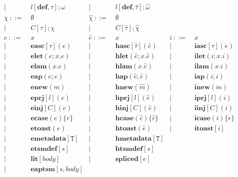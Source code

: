 \documentclass{sig-alternate}[10pt]
\newcommand{\T}{\mathtt{T}}
\begin{document}
\[\begin{array}{rlrlrl}
   |~&  ~l[\mathbf{def}, \tau];\omega       &|~ & ~l[\mathbf{def}, \hat\tau];\hat\omega\\
   \chi       ~::=&~  \emptyset         &\hat\chi ~::=&~  \emptyset\\
   |~&  ~C[\tau];\chi               &|~&  ~C[\hat\tau];\hat{\chi}\\
  e       ~::=&~ x                &\hat{e}  ~::=&~  x                     & i     ~::=&~  x\\
        | ~ &~ \mathbf{easc}[\tau](e)     &       | ~ &~  \mathbf{hasc}[\hat\tau](\hat{e})    &       | ~ &~  \mathbf{iasc}[\tau](\dot{e})\\
        | ~ &~ \mathbf{elet}(e; x.e)        &       | ~ &~  \mathbf{hlet}(\hat{e}; x.\hat{e})   &       | ~ &~  \mathbf{ilet}(i;x.i)\\
        | ~ &~ \mathbf{elam}(x.e)           &       | ~ &~  \mathbf{hlam}(x.\hat{e})        &       | ~ &~  \mathbf{ilam}(x.i)\\
        | ~ &~ \mathbf{eap}(e;e)          &       | ~ &~  \mathbf{hap}(\hat{e};\hat{e})     &       | ~ &~  \mathbf{iap}(i;i)\\
        | ~ &~ \mathbf{enew}(m)           &       | ~ &~  \mathbf{hnew}(\hat{m})          &       | ~ &~  \mathbf{inew}(\dot{m})\\
        | ~ &~ \mathbf{eprj}[l](e)          &       | ~ &~  \mathbf{hprj}[l](\hat{e})       &       | ~ &~  \mathbf{iprj}[l](i)\\
        | ~ &~ \mathbf{einj}[C](e)          &       | ~ &~  \mathbf{hinj}[C](\hat{e})       &       | ~ &~  \mathbf{iinj}[C](i)\\
        | ~ &~ \mathbf{ecase}(e)\{r\}         &       | ~ &~  \mathbf{hcase}(\hat{e})\{\hat{r}\}    &       | ~ &~  \mathbf{icase}(i)\{\dot{r}\}\\
        | ~ &~ \mathbf{etoast}(e)           &       | ~ &~  \mathbf{htoast}(\hat{e})        &       | ~ &~  \mathbf{itoast}[i]\\
        | ~ &~ \mathbf{emetadata}[\T]         &       | ~ &~  \mathbf{hmetadata}[\T]\\
        | ~ &~ \mathbf{etsmdef}[s]        &       | ~ &~  \mathbf{htsmdef}[s]\\
        | ~ &~ \mathbf{lit}[body]       &       | ~ &~  \mathbf{spliced}[e]\\
        | ~ &~ \mathbf{eaptsm}[s,body]\\

\end{array}\]
\end{document}
